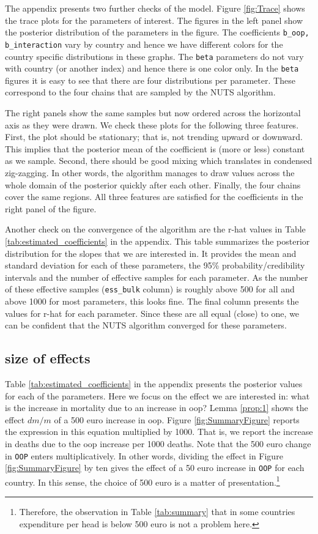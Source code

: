 \documentclass[a4paper,12pt]{article}
\begin{document}
The appendix presents two further checks of the model. Figure \ref{fig:Trace} shows the trace plots for the parameters of interest. The figures in the left panel show the posterior distribution of the parameters in the figure. The coefficients \texttt{b\_oop, b\_interaction} vary by country and hence we have different colors for the country specific distributions in these graphs. The \texttt{beta} parameters do not vary with country (or another index) and hence there is one color only. In the \texttt{beta} figures it is easy to see that there are four distributions per parameter. These correspond to the four chains that are sampled by the NUTS algorithm.

The right panels show the same samples but now ordered across the horizontal axis as they were drawn. We check these plots for the following three features. First, the plot should be stationary; that is, not trending upward or downward. This implies that the posterior mean of the coefficient is (more or less) constant as we sample. Second, there should be good mixing which translates in condensed zig-zagging. In other words, the algorithm manages to draw values across the whole domain of the posterior quickly after each other. Finally, the four chains cover the same regions. All three features are satisfied for the coefficients in the right panel of the figure.

Another check on the convergence of the algorithm are the r-hat values in Table \ref{tab:estimated_coefficients} in the appendix. This table summarizes the posterior distribution for the slopes that we are interested in. It provides the mean and standard deviation for each of these parameters, the 95\% probability/credibility intervals and the number of effective samples for each parameter. As the number of these effective samples (\texttt{ess\_bulk} column) is roughly above 500 for all and above 1000 for most parameters, this looks fine. The final column presents the values for r-hat for each parameter. Since these are all equal (close) to one, we can be confident that the NUTS algorithm converged for these parameters.

\subsection{size of effects}
\label{sec:orga7dd568}

Table \ref{tab:estimated_coefficients} in the appendix presents the posterior values for each of the parameters. Here we focus on the effect we are interested in: what is the increase in mortality due to an increase in oop? Lemma \ref{prop:1} shows the effect \(dm/m\) of a 500 euro increase in oop. Figure \ref{fig:SummaryFigure} reports the expression in this equation multiplied by 1000. That is, we report the increase in deaths due to the oop increase per 1000 deaths. Note that the 500 euro change in \texttt{OOP} enters multiplicatively. In other words, dividing the effect in Figure \ref{fig:SummaryFigure} by ten gives the effect of a 50 euro increase in \texttt{OOP} for each country. In this sense, the choice of 500 euro is a matter of presentation.\footnote{Therefore, the observation in Table \ref{tab:summary} that in some countries expenditure per head is below 500 euro is not a problem here.}
\end{document}
